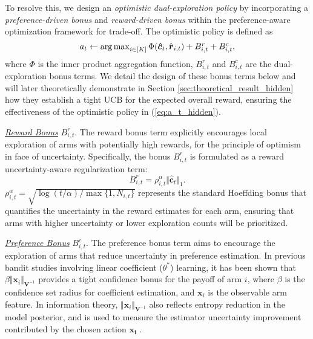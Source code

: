 To resolve this, we design an \emph{optimistic dual-exploration policy} by incorporating a \emph{preference-driven bonus} and \emph{reward-driven bonus} within the preference-aware optimization framework for trade-off.
The optimistic policy is defined as
\begin{equation}
\label{eq:a_t_hidden}
\textstyle
a_t \leftarrow \operatorname*{arg\,max}_{i \in [K]} \Phi ( \boldsymbol{\hat{c}}_t,  \hat{\boldsymbol{r}}_{i,t}) + B_{i,t}^{r} + B_{i,t}^{c},
\end{equation}
where $\Phi$ is the inner product aggregation function, $B_{i,t}^{r}$ and $B_{i,t}^{c}$ are the dual-exploration bonus terms. We detail the design of these bonus terms below and will later theoretically demonstrate in Section \ref{sec:theoretical_result_hidden} how they establish a tight UCB for the expected overall reward, ensuring the effectiveness of the optimistic policy in (\ref{eq:a_t_hidden}).

\underline{\emph{Reward Bonus}} $B_{i,t}^{r}$.
The reward bonus term explicitly encourages local exploration of arms with potentially high rewards, for the principle of optimism in face of uncertainty. Specifically, the bonus $B_{i,t}^{r}$ is formulated as a reward uncertainty-aware regularization term:
\begin{equation}
B_{i,t}^{r} = \rho_{i,t}^{\alpha} \Vert \hat{\boldsymbol{c}}_t \Vert_1.
\end{equation}
$\rho_{i,t}^{\alpha} = \sqrt{ \log(t/\alpha) / \max \{1, N_{i, t } \} }$ represents the standard Hoeffding bonus that quantifies the uncertainty in the reward estimates for each arm, ensuring that arms with higher uncertainty or lower exploration counts will be prioritized.

\underline{\emph{Preference Bonus}} $B_{i,t}^{c}$.
The preference bonus term aims to encourage the exploration of arms that reduce uncertainty in preference estimation.
In previous bandit studies \cite{abbasi2011improved, zhao2020simple, he2022nearly} involving linear coefficient ($\theta^*$) learning, it has been shown that $\beta \Vert \boldsymbol{x}_i \Vert_{\boldsymbol{V}^{-1}}$ provides a tight confidence bonus for the payoff of arm $i$, where $\beta$ is the confidence set radius for coefficient estimation, and $\boldsymbol{x}_i$ is the observable arm feature. In information theory, $\Vert \boldsymbol{x}_i \Vert_{\boldsymbol{V}^{-1}}$ also reflects entropy reduction in the model posterior, and is used to measure the estimator uncertainty improvement contributed by the chosen action $\boldsymbol{x_i}$ \cite{li2010contextual}.

